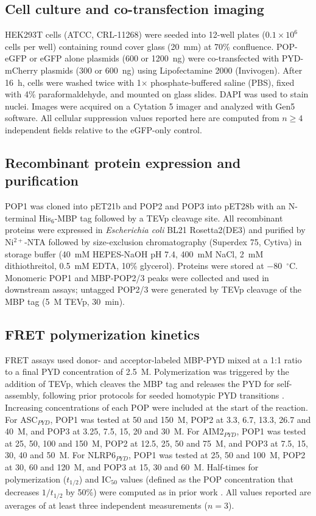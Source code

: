 \documentclass[11pt]{article}
\begin{document}
\subsection{Cell culture and co-transfection imaging}

HEK293T cells (ATCC, CRL-11268) were seeded into 12-well plates
($0.1 \times 10^{6}$ cells per well) containing round cover glass
(20~mm) at 70\% confluence. POP-eGFP or eGFP alone plasmids (600 or
1200~ng) were co-transfected with PYD-mCherry plasmids (300 or 600~ng)
using Lipofectamine 2000 (Invivogen). After 16~h, cells were washed twice
with 1$\times$ phosphate-buffered saline (PBS), fixed with 4\%
paraformaldehyde, and mounted on glass slides. DAPI was used to stain
nuclei. Images were acquired on a Cytation 5 imager and analyzed with
Gen5 software. All cellular suppression values reported here are
computed from $n \geq 4$ independent fields relative to the eGFP-only
control.

\subsection{Recombinant protein expression and purification}

POP1 was cloned into pET21b and POP2 and POP3 into pET28b with an
N-terminal His$_6$-MBP tag followed by a TEVp cleavage site. All
recombinant proteins were expressed in \emph{Escherichia coli} BL21
Rosetta2(DE3) and purified by Ni$^{2+}$-NTA followed by size-exclusion
chromatography (Superdex 75, Cytiva) in storage buffer
(40~mM HEPES-NaOH pH 7.4, 400~mM NaCl, 2~mM dithiothreitol,
0.5~mM EDTA, 10\% glycerol). Proteins were stored at $-80$~$^{\circ}$C.
Monomeric POP1 and MBP-POP2/3 peaks were collected and used in downstream
assays; untagged POP2/3 were generated by TEVp cleavage of the MBP tag
(5~\textmu M TEVp, 30~min).

\subsection{FRET polymerization kinetics}

FRET assays used donor- and acceptor-labeled MBP-PYD mixed at a 1:1 ratio
to a final PYD concentration of 2.5~\textmu M. Polymerization was triggered
by the addition of TEVp, which cleaves the MBP tag and releases the PYD for
self-assembly, following prior protocols for seeded homotypic PYD
transitions \citep{hochheiser2022seeding}. Increasing concentrations of each POP were included at the
start of the reaction. For ASC$_{PYD}$, POP1 was tested at 50 and 150~\textmu M,
POP2 at 3.3, 6.7, 13.3, 26.7 and 40~\textmu M, and POP3 at 3.25, 7.5, 15, 20
and 30~\textmu M. For AIM2$_{PYD}$, POP1 was tested at 25, 50, 100 and
150~\textmu M, POP2 at 12.5, 25, 50 and 75~\textmu M, and POP3 at 7.5, 15,
30, 40 and 50~\textmu M. For NLRP6$_{PYD}$, POP1 was tested at 25, 50 and
100~\textmu M, POP2 at 30, 60 and 120~\textmu M, and POP3 at 15, 30 and
60~\textmu M. Half-times for polymerization ($t_{1/2}$) and IC$_{50}$ values
(defined as the POP concentration that decreases $1/t_{1/2}$ by 50\%) were
computed as in prior work \citep{matyszewski2018digital,
matyszewski2021distinct}. All values reported are averages of at least
three independent measurements ($n = 3$).
\end{document}
